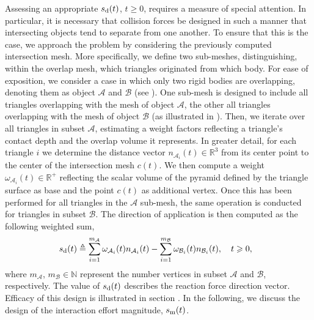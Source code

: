 Assessing an appropriate $s_{\text d}(t)$, $t\geqslant 0$, requires a measure of special attention. In particular, it is necessary that collision forces be designed in such a manner that intersecting objects tend to separate from one another.
To ensure that this is the case, we approach the problem by considering the previously computed intersection mesh. More specifically, we define two sub-meshes, distinguishing, within the overlap mesh, which triangles originated from which body. For ease of exposition, we consider a case in which only two rigid bodies are overlapping, denoting them as object $\mathcal A$ and $\mathcal B$ (see ). One sub-mesh is designed to include all triangles overlapping with the mesh of object $\mathcal A$, the other all triangles overlapping with the mesh of object $\mathcal B$ (as illustrated in ). Then, we iterate over all triangles in subset $\mathcal A$, estimating a weight factors reflecting a triangle's contact depth and the overlap volume it represents. In greater detail, for each triangle $i$ we determine the distance vector $n_{\mathcal{A}_i}(t) \in \mathds{R}^3$ from its center point to the center of the intersection mesh $c(t)$. We then compute a weight $\omega_{\mathcal{A}_i}(t) \in \mathds{R}^+$ reflecting the scalar volume of the pyramid defined by the triangle surface as base and the point $c(t)$ as additional vertex. Once this has been performed for all triangles in the $\mathcal A$ sub-mesh, the same operation is conducted for triangles in subset $\mathcal B$. The direction of application is then computed as the following weighted sum,
%
\begin{equation}
	s_{\text d}(t) \triangleq \sum_{i=1}^{m_\mathcal{A}} \omega_{\mathcal{A}_i}(t)n_{\mathcal{A}_i}(t) - \sum_{i=1}^{m_\mathcal{B}} \omega_{\mathcal{B}_i}(t)n_{\mathcal{B}_i}(t), \quad t\geqslant0,\hspace{0.1in}
\end{equation}
%
\noindent where $m_\mathcal{A}$, $m_\mathcal{B} \in \mathds N$ represent the number vertices in subset $\mathcal{A}$ and $\mathcal{B}$, respectively. The value of $s_{\text d}(t)$ describes the reaction force direction vector. Efficacy of this design is illustrated in section . In the following, we discuss the design of the interaction effort magnitude, $s_{\rm m}(t)$.


